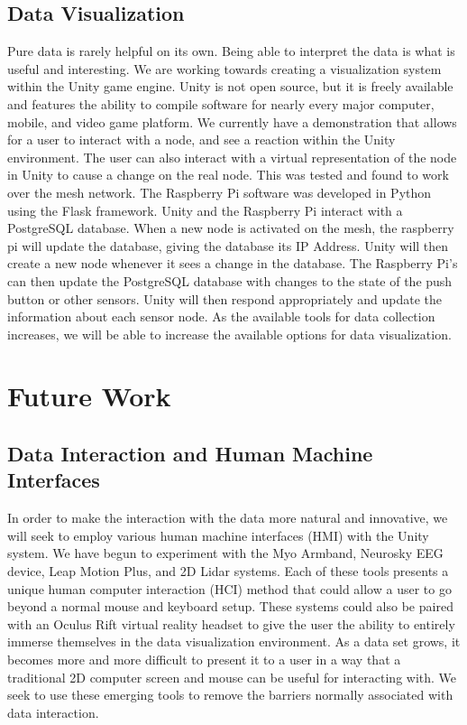 \documentclass{IEEEtran}
\begin{document}
\subsection{Data Visualization}
    Pure data is rarely helpful on its own. Being able to interpret the data is what is useful and interesting. We are working towards creating a visualization system within the Unity game engine. Unity is not open source, but it is freely available and features the ability to compile software for nearly every major computer, mobile, and video game platform. We currently have a demonstration that allows for a user to interact with a node, and see a reaction within the Unity environment. The user can also interact with a virtual representation of the node in Unity to cause a change on the real node. This was tested and found to work over the mesh network. The Raspberry Pi software was developed in Python using the Flask framework. Unity and the Raspberry Pi interact with a PostgreSQL database. When a new node is activated on the mesh, the raspberry pi will update the database, giving the database its IP Address. Unity will then create a new node whenever it sees a change in the database.  The Raspberry Pi’s can then update the PostgreSQL database with changes to the state of the push button or other sensors. Unity will then respond appropriately and update the information about each sensor node. As the available tools for data collection increases, we will be able to increase the available options for data visualization. 
\section{Future Work}

\subsection{Data Interaction and Human Machine Interfaces}
In order to make the interaction with the data more natural and innovative, we will seek to employ various human machine interfaces  (HMI) with the Unity system. We have begun to experiment with the Myo Armband, Neurosky EEG device, Leap Motion Plus, and 2D Lidar systems. Each of these tools presents a unique human computer interaction (HCI) method that could allow a user to go beyond a normal mouse and keyboard setup. These systems could also be paired with an Oculus Rift virtual reality headset to give the user the ability to entirely immerse themselves in the data visualization environment.  As a data set grows, it becomes more and more difficult to present it to a user in a way that a traditional 2D computer screen and mouse can be useful for interacting with. We seek to use these emerging tools to remove the barriers normally associated with data interaction. 
\end{document}
